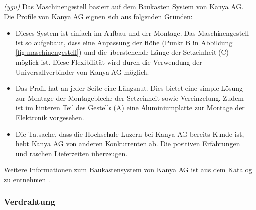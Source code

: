 \textit{(ygu)} Das Maschinengestell basiert auf dem Baukasten System von Kanya AG. Die Profile von Kanya AG eignen sich aus folgenden Gründen:
\begin{itemize}
	\item Dieses System ist einfach im Aufbau und der Montage. Das Maschinengestell ist so aufgebaut, dass eine Anpassung der Höhe (Punkt B in Abbildung \ref{fig:maschinengestell}) und die überstehende Länge der Setzeinheit (C) möglich ist. Diese Flexibilität wird durch die Verwendung der Universallverbinder von Kanya AG möglich.
	
	\item Das Profil hat an jeder Seite eine Längsnut. Dies bietet eine simple Lösung zur Montage der Montagebleche der Setzeinheit sowie Vereinzelung. Zudem ist im hinteren Teil des Gestells (A) eine Aluminiumplatte zur Montage der Elektronik vorgesehen.
	
	\item Die Tatsache, dass die Hochschule Luzern bei Kanya AG bereits Kunde ist, hebt Kanya AG von anderen Konkurrenten ab. Die positiven Erfahrungen und raschen Lieferzeiten überzeugen.
\end{itemize}
Weitere Informationen zum Baukastensystem von Kanya AG ist aus dem Katalog zu entnehmen \cite{kanya}.
\subsubsection{Verdrahtung}
